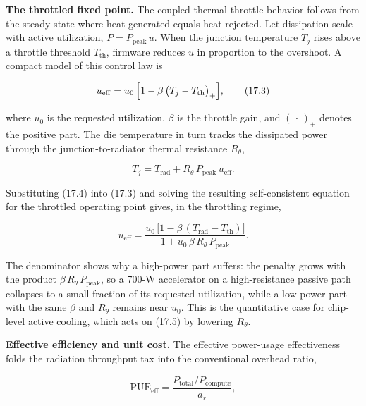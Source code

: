 \documentclass[
  11pt,
  openany,
  oneside]{book}
\begin{document}
\textbf{The throttled fixed point.} The coupled thermal-throttle
behavior follows from the steady state where heat generated equals heat
rejected. Let dissipation scale with active utilization,
\(P = P_{\mathrm{peak}}\,u\). When the junction temperature \(T_j\)
rises above a throttle threshold \(T_{\mathrm{th}}\), firmware reduces
\(u\) in proportion to the overshoot. A compact model of this control
law is

\begin{equation}
u_{\mathrm{eff}} = u_0\,\Bigl[1 - \beta\,\bigl(T_j - T_{\mathrm{th}}\bigr)_{+}\Bigr], \tag{17.3}
\end{equation}

where \(u_0\) is the requested utilization, \(\beta\) is the throttle
gain, and \((\,\cdot\,)_{+}\) denotes the positive part. The die
temperature in turn tracks the dissipated power through the
junction-to-radiator thermal resistance \(R_{\theta}\),

\begin{equation}
T_j = T_{\mathrm{rad}} + R_{\theta}\,P_{\mathrm{peak}}\,u_{\mathrm{eff}}. \tag{17.4}
\end{equation}

Substituting (17.4) into (17.3) and solving the resulting
self-consistent equation for the throttled operating point gives, in the
throttling regime,

\begin{equation}
u_{\mathrm{eff}} = \frac{u_0\,\bigl[1 - \beta\,(T_{\mathrm{rad}} - T_{\mathrm{th}})\bigr]}{1 + u_0\,\beta\,R_{\theta}\,P_{\mathrm{peak}}}. \tag{17.5}
\end{equation}

The denominator shows why a high-power part suffers: the penalty grows
with the product \(\beta\,R_{\theta}\,P_{\mathrm{peak}}\), so a 700-W
accelerator on a high-resistance passive path collapses to a small
fraction of its requested utilization, while a low-power part with the
same \(\beta\) and \(R_{\theta}\) remains near \(u_0\). This is the
quantitative case for chip-level active cooling, which acts on (17.5) by
lowering \(R_{\theta}\).

\textbf{Effective efficiency and unit cost.} The effective power-usage
effectiveness folds the radiation throughput tax into the conventional
overhead ratio,

\begin{equation}
\mathrm{PUE}_{\mathrm{eff}} = \frac{P_{\mathrm{total}}/P_{\mathrm{compute}}}{a_r}, \tag{17.6}
\end{equation}
\end{document}
